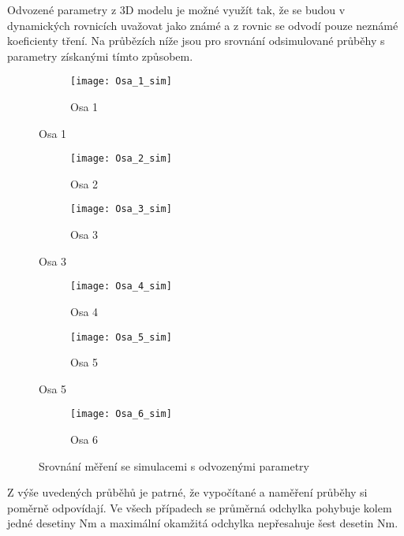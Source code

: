 Odvozené parametry z 3D modelu je možné využít tak, že se budou v dynamických rovnicích uvažovat jako známé a z rovnic se odvodí pouze neznámé koeficienty tření. Na průbězích níže jsou pro srovnání odsimulované průběhy s parametry získanými tímto způsobem. 

\hfill
\begin{figure}[h]
    \centering
    \begin{subfigure}[b]{1\textwidth}
        \texttt{[image: Osa\_1\_sim]}
        \caption{Osa 1}
        \label{osa_1_sim_pic}
        \end{subfigure}
\end{figure}
\begin{figure}\ContinuedFloat    
    \begin{subfigure}[b]{1\textwidth}
        \texttt{[image: Osa\_2\_sim]}
        \caption{Osa 2}
        \label{osa_2_sim_pic}
    \end{subfigure}
    \begin{subfigure}[b]{1\textwidth}
        \texttt{[image: Osa\_3\_sim]}
        \caption{Osa 3}
        \label{osa_3_sim_pic}
    \end{subfigure}
\end{figure}
\begin{figure}\ContinuedFloat
    \begin{subfigure}[b]{1\textwidth}
        \texttt{[image: Osa\_4\_sim]}
        \caption{Osa 4}
        \label{osa_4_sim_pic}
    \end{subfigure}
    \begin{subfigure}[b]{1\textwidth}
        \texttt{[image: Osa\_5\_sim]}
        \caption{Osa 5}
        \label{osa_5_sim_pic}
    \end{subfigure}
\end{figure}

\clearpage

\begin{figure}\ContinuedFloat
    \begin{subfigure}[b]{1\textwidth}
        \texttt{[image: Osa\_6\_sim]}
        \caption{Osa 6}
        \label{osa_6_sim_pic}
    \end{subfigure}
    \caption{Srovnání měření se simulacemi s odvozenými parametry}\label{osy_sim_pic}
\end{figure}

Z výše uvedených průběhů je patrné, že vypočítané a naměření průběhy si poměrně odpovídají. Ve všech případech se průměrná odchylka pohybuje kolem jedné desetiny Nm a maximální okamžitá odchylka nepřesahuje šest desetin Nm. 

